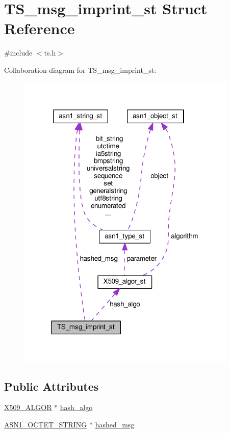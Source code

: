\hypertarget{struct_t_s__msg__imprint__st}{}\section{T\+S\+\_\+msg\+\_\+imprint\+\_\+st Struct Reference}
\label{struct_t_s__msg__imprint__st}


{\ttfamily \#include $<$ts.\+h$>$}



Collaboration diagram for T\+S\+\_\+msg\+\_\+imprint\+\_\+st\+:
\nopagebreak
\begin{figure}[H]
\begin{center}
\leavevmode
\includegraphics[width=296pt]{struct_t_s__msg__imprint__st__coll__graph}
\end{center}
\end{figure}
\subsection*{Public Attributes}
\begin{DoxyCompactItemize}
\item 
\hyperlink{ossl__typ_8h_aa2b6185e6254f36f709cd6577fb5022e}{X509\+\_\+\+A\+L\+G\+OR} $\ast$ \hyperlink{struct_t_s__msg__imprint__st_aa0d4da96ba582b7b29ffe2acd192d10e}{hash\+\_\+algo}
\item 
\hyperlink{ossl__typ_8h_afbd05e94e0f0430a2b729473efec88c1}{A\+S\+N1\+\_\+\+O\+C\+T\+E\+T\+\_\+\+S\+T\+R\+I\+NG} $\ast$ \hyperlink{struct_t_s__msg__imprint__st_a0be6581788c745f9e1d872c47d511dad}{hashed\+\_\+msg}
\end{DoxyCompactItemize}


